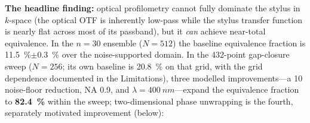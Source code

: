 \documentclass[review,12pt]{elsarticle}
\begin{document}
\textbf{The headline finding:} optical profilometry cannot fully dominate the stylus in $k$-space (the optical OTF is inherently low-pass while the stylus transfer function is nearly flat across most of its passband), but it \emph{can} achieve near-total equivalence. In the $n=30$ ensemble ($N=512$) the baseline equivalence fraction is \SI{11.5}{\percent}$\pm$\SI{0.3}{\percent} over the noise-supported domain. In the 432-point gap-closure sweep ($N=256$; its own baseline is \SI{20.8}{\percent} on that grid, with the grid dependence documented in the Limitations), three modelled improvements---a \SI{10}{\times} noise-floor reduction, NA 0.9, and $\lambda=\SI{400}{nm}$---expand the equivalence fraction to \textbf{\SI{82.4}{\percent}} within the sweep; two-dimensional phase unwrapping is the fourth, separately motivated improvement (below):
\end{document}
